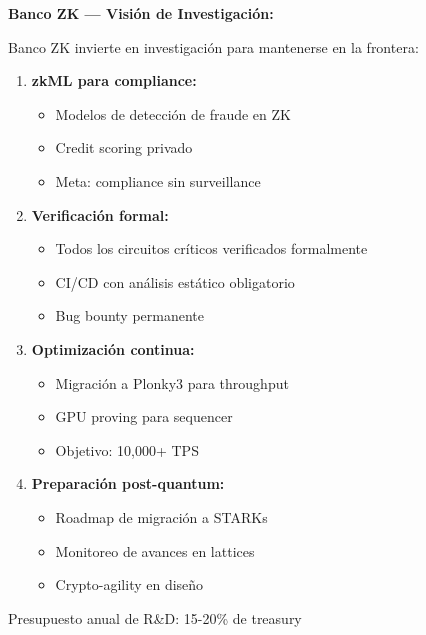 \documentclass[11pt,a4paper,twoside]{book}
\begin{document}
\begin{bancozk}
\textbf{Banco ZK --- Visi\'on de Investigaci\'on:}

Banco ZK invierte en investigaci\'on para mantenerse en la frontera:

\begin{enumerate}
    \item \textbf{zkML para compliance:}
    \begin{itemize}
        \item Modelos de detecci\'on de fraude en ZK
        \item Credit scoring privado
        \item Meta: compliance sin surveillance
    \end{itemize}
    
    \item \textbf{Verificaci\'on formal:}
    \begin{itemize}
        \item Todos los circuitos cr\'iticos verificados formalmente
        \item CI/CD con an\'alisis est\'atico obligatorio
        \item Bug bounty permanente
    \end{itemize}
    
    \item \textbf{Optimizaci\'on continua:}
    \begin{itemize}
        \item Migraci\'on a Plonky3 para throughput
        \item GPU proving para sequencer
        \item Objetivo: 10,000+ TPS
    \end{itemize}
    
    \item \textbf{Preparaci\'on post-quantum:}
    \begin{itemize}
        \item Roadmap de migraci\'on a STARKs
        \item Monitoreo de avances en lattices
        \item Crypto-agility en dise\~no
    \end{itemize}
\end{enumerate}

Presupuesto anual de R\&D: 15-20\% de treasury
\end{bancozk}

\end{document}
